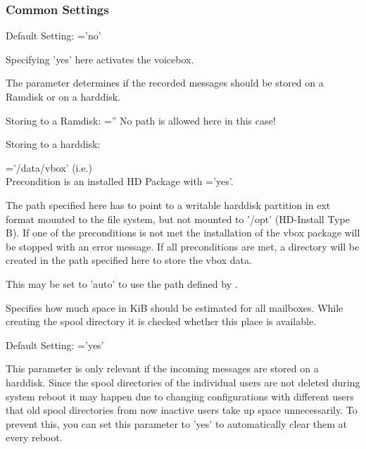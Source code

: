 \subsubsection{Common Settings}
\begin{description}


        Default Setting: ='no'

        Specifying 'yes' here activates the voicebox.


    The parameter  determines if the recorded messages
    should be stored on a Ramdisk or on a harddisk.

    Storing to a Ramdisk:
    =''
    No path is allowed here in this case!

    Storing to a harddisk:

    ='/data/vbox' (i.e.)\\
    Precondition is an installed HD Package with ='yes'.

    The path specified here has to point to a writable harddisk partition in ext format mounted
    to the file system, but not mounted to '/opt' (HD-Install Type B). If one of the preconditions
    is not met the installation of the vbox package will be stopped with an error message.
    If all preconditions are met, a directory  will be created in the path
    specified here to store the vbox data.

    This may be set to 'auto' to use the path defined by .

    
    Specifies how much space in KiB should be estimated for all mailboxes.
    While creating the spool directory it is checked whether this place is available.

    
    Default Setting: ='yes'
    
    This parameter is only relevant if the incoming messages are stored on a harddisk. Since
    the spool directories of the individual users are not deleted during system reboot it may
    happen due to changing configurations with different users that old spool directories
    from now inactive users take up space unnecessarily. To prevent this, you can set this
    parameter to 'yes' to automatically clear them at every reboot.


\end{description}
